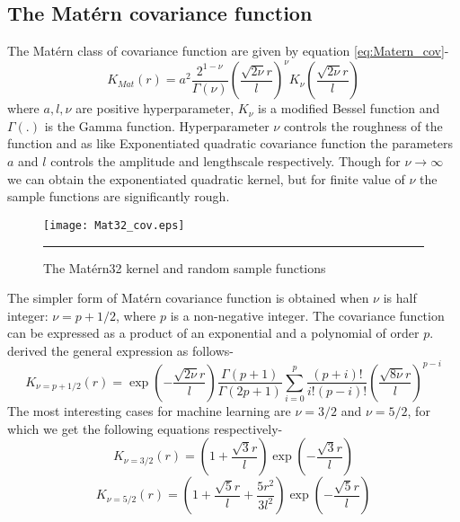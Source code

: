 \subsection{The Mat{\'e}rn covariance function}
The Mat{\'e}rn class of covariance function are given by equation \ref{eq:Matern_cov}-
\begin{equation} \label{eq:Matern_cov}
K_{Mat}(r)= a^2\frac{2^{1-\nu}}{\Gamma(\nu)}\left(\frac{\sqrt{2\nu}r}{l}\right)^\nu K_{\nu}
	  \left(\frac{\sqrt{2\nu}r}{l}\right)
\end{equation}
where $a, l, \nu$ are positive hyperparameter, $K_{\nu}$ is a modified Bessel function and
$\Gamma \left(.\right)$ is the Gamma function. Hyperparameter $\nu$ controls the roughness 
of the function and as like Exponentiated quadratic covariance function the parameters
$a$ and $l$ controls the amplitude and lengthscale respectively. Though for $\nu \to \infty$
we can obtain the exponentiated quadratic kernel, but for finite value of $\nu$ the sample 
functions are significantly rough. 
\begin{figure}[htbp]
	\centering
		\texttt{[image: Mat32\_cov.eps]}
		\rule{35em}{0.5pt}
	\caption[The Mat{\'e}rn32 kernel and random sample functions]
		{The Mat{\'e}rn32 kernel and random sample functions}
	\label{fig:Matern32_covariance}
\end{figure}
The simpler form of Mat{\'e}rn covariance function is obtained when $\nu$ is half integer:
$\nu = p+1/2$, where $p$ is a non-negative integer. The covariance function can be expressed 
as a product of an exponential and a polynomial of order $p$. \cite{Abramowitz:1965} 
derived the general expression as follows-
\begin{equation} \label{eq:MaternGeneral}
K_{\nu=p+1/2}(r)= \exp \left( - \frac{\sqrt{2\nu}r}{l}\right)\frac{\Gamma\left(p+1\right)}{\Gamma\left(2p+1\right)}
		\sum_{i=0}^{p}\frac{\left(p+i\right)!}{i!\left(p-i\right)!}
		\left(\frac{\sqrt{8\nu}r}{l}\right)^{p-i}
\end{equation}
The most interesting cases for machine learning
are $\nu =3/2$ and $\nu=5/2$, for which we get the following equations respectively-
\begin{equation} \label{eq:Matern32}
K_{\nu=3/2}(r)= \left(1+ \frac{\sqrt{3}r}{l} \right)\exp \left( - \frac{\sqrt{3}r}{l} \right)
\end{equation}
\begin{equation} \label{eq:Matern52}
K_{\nu=5/2}(r)= \left(1+ \frac{\sqrt{5}r}{l} + \frac{5r^2}{3l^2} \right)
		\exp \left( - \frac{\sqrt{5}r}{l} \right)
\end{equation}

